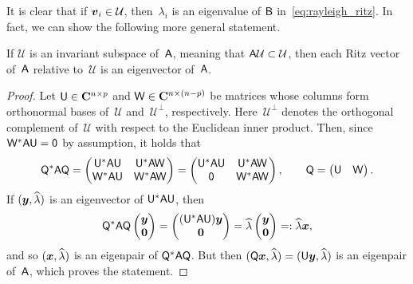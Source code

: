 It is clear that if $\mathbf{\boldsymbol{v}}_i \in \mathcal U$,
then~$\lambda_i$ is an eigenvalue of $\mathsf B$ in~\eqref{eq:rayleigh_ritz}.
In fact,
we can show the following more general statement.
\begin{proposition}
    \label{proposition:invariant_subpsace_ritz}
    If $\mathcal U$ is an invariant subspace of~$\mathsf A$,
    meaning that $\mathsf A \mathcal U \subset \mathcal U$,
    then each Ritz vector of~$\mathsf A$ relative to~$\mathcal U$ is an eigenvector of~$\mathsf A$.
\end{proposition}
\begin{proof}
    Let $\mathsf U \in \mathbf C^{n \times p}$ and $\mathsf W \in \mathbf C^{n \times (n-p)}$ be matrices whose columns form orthonormal bases of~$\mathcal U$ and~$\mathcal U^\perp$,
    respectively.
    Here~$\mathcal U^\perp$ denotes the orthogonal complement of~$\mathcal U$ with respect to the Euclidean inner product.
    Then, since~$\mathsf W^* \mathsf A \mathsf U = \mathsf 0$ by assumption,
    it holds that
    \[
        \mathsf Q^* \mathsf A \mathsf Q =
        \begin{pmatrix}
            \mathsf U^* \mathsf A \mathsf U & \mathsf U^* \mathsf A \mathsf W \\
            \mathsf W^* \mathsf A \mathsf U & \mathsf W^* \mathsf A \mathsf W
        \end{pmatrix}
        =
        \begin{pmatrix}
            \mathsf U^* \mathsf A \mathsf U & \mathsf U^* \mathsf A \mathsf W \\
             \mathsf 0 & \mathsf W^* \mathsf A \mathsf W
        \end{pmatrix},
        \qquad
        \mathsf Q = \begin{pmatrix} \mathsf U & \mathsf W \end{pmatrix}.
    \]
    If $(\mathbf{\boldsymbol{y}}, \widehat \lambda)$ is an eigenvector of $\mathsf U^* \mathsf A \mathsf U$,
    then
    \[
        \mathsf Q^* \mathsf A \mathsf Q
        \begin{pmatrix}
            \mathbf{\boldsymbol{y}} \\
            \mathbf{\boldsymbol{0}}
        \end{pmatrix}
        =
        \begin{pmatrix}
            (\mathsf U^* \mathsf A \mathsf U) \mathbf{\boldsymbol{y}} \\
            \mathbf{\boldsymbol{0}}
        \end{pmatrix}
        =
        \widehat \lambda
        \begin{pmatrix}
            \mathbf{\boldsymbol{y}} \\
            \mathbf{\boldsymbol{0}}
        \end{pmatrix}
        =:
        \widehat \lambda \mathbf{\boldsymbol{x}},
    \]
    and so $(\mathbf{\boldsymbol{x}}, \widehat \lambda)$ is an eigenpair of $\mathsf Q^* \mathsf A \mathsf Q$.
    But then $(\mathsf Q \mathbf{\boldsymbol{x}}, \widehat \lambda) = (\mathsf U \mathbf{\boldsymbol{y}}, \widehat \lambda)$ is an eigenpair of~$\mathsf A$,
    which proves the statement.
\end{proof}

